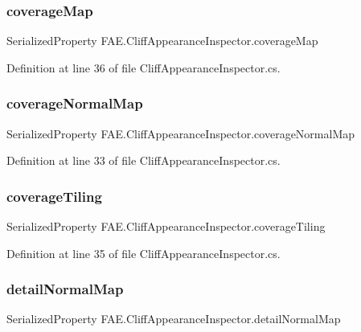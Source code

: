 \subsubsection{coverage\+Map}
{\footnotesize\ttfamily Serialized\+Property F\+A\+E.\+Cliff\+Appearance\+Inspector.\+coverage\+Map}



Definition at line 36 of file Cliff\+Appearance\+Inspector.\+cs.

\mbox{\label{class_f_a_e_1_1_cliff_appearance_inspector_aa7cb61ecce6300e676f43b6753456c87}} 
\subsubsection{coverage\+Normal\+Map}
{\footnotesize\ttfamily Serialized\+Property F\+A\+E.\+Cliff\+Appearance\+Inspector.\+coverage\+Normal\+Map}



Definition at line 33 of file Cliff\+Appearance\+Inspector.\+cs.

\mbox{\label{class_f_a_e_1_1_cliff_appearance_inspector_a494221e52e43681e62697763d00ab8a8}} 
\subsubsection{coverage\+Tiling}
{\footnotesize\ttfamily Serialized\+Property F\+A\+E.\+Cliff\+Appearance\+Inspector.\+coverage\+Tiling}



Definition at line 35 of file Cliff\+Appearance\+Inspector.\+cs.

\mbox{\label{class_f_a_e_1_1_cliff_appearance_inspector_a488226a3cce9d19cc6e892e038884181}} 
\subsubsection{detail\+Normal\+Map}
{\footnotesize\ttfamily Serialized\+Property F\+A\+E.\+Cliff\+Appearance\+Inspector.\+detail\+Normal\+Map}




